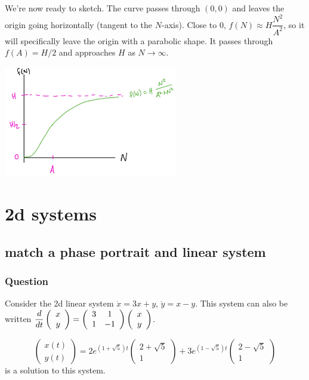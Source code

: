 \documentclass[12pt,letterpaper,noanswers]{exam}
\begin{document}
We're now ready to sketch.  The curve passes through $(0,0)$ and leaves the origin going horizontally (tangent to the $N$-axis).  Close to $0$, $f(N) \approx H \dfrac{N^2}{A^2}$, so it will specifically leave the origin with a parabolic shape.  It passes through $f(A) = H/2$ and approaches $H$ as $N \rightarrow\infty$.

\includegraphics[width=3in]{img/C08soln-Hillfcnplot-p1.png}

\section{2d systems}

\subsection{match a phase portrait and linear system}
\subsubsection{Question}
Consider the 2d linear system $\dot x = 3x+y$, $\dot y = x-y$.  This system can also be written $\displaystyle \frac{d}{dt}\left(\begin{array}{c} x \\ y \end{array}\right) = \left(\begin{array}{c c} 3 & 1 \\ 1  & -1 \end{array}\right)\left(\begin{array}{c} x \\ y \end{array}\right)$.

\[\left(\begin{array}{c} x(t) \\ y(t) \end{array}\right) = 2e^{(1+\sqrt{5})t}\left(\begin{array}{c} 2+\sqrt{5} \\ 1 \end{array}\right)+3e^{(1-\sqrt{5})t}\left(\begin{array}{c} 2-\sqrt{5} \\ 1 \end{array}\right)\] is a solution to this system.
\end{document}

